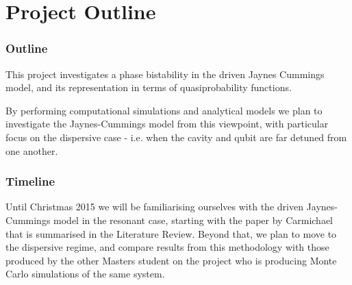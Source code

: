 \part{Project Outline}
\section{Outline}
This project investigates a phase bistability in the driven Jaynes Cummings model, and its representation in terms of quasiprobability functions. 

By performing computational simulations and analytical models we plan to investigate the Jaynes-Cummings model from this viewpoint, with particular focus on the dispersive case - i.e. when the cavity and qubit are far detuned from one another. 
\section{Timeline}
Until Christmas 2015 we will be familiarising ourselves with the driven Jaynes-Cummings model in the resonant case, starting with the paper by Carmichael that is summarised in the Literature Review. Beyond that, we plan to move to the dispersive regime, and compare results from this methodology with those produced by the other Masters student on the project who is producing Monte Carlo simulations of the same system.


